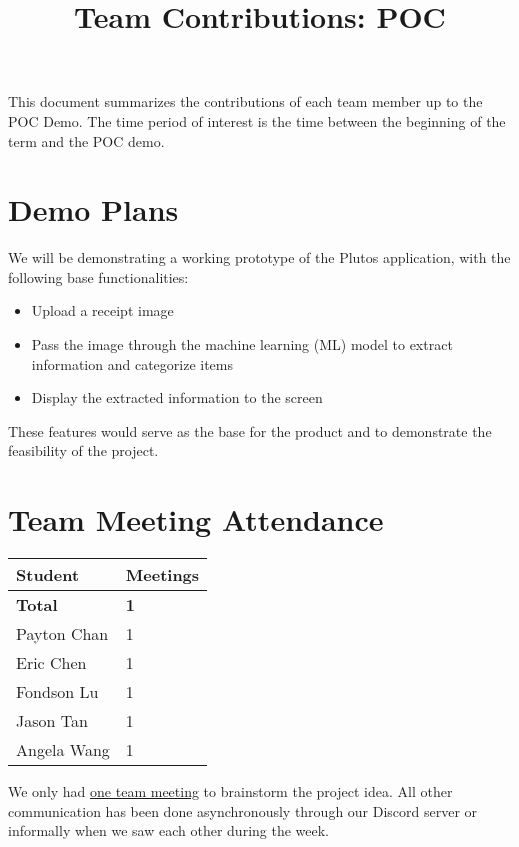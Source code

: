 \documentclass{article}
\title{Team Contributions: POC\\\progname}
\author{\authname}
\date{}
\begin{document}
\maketitle

This document summarizes the contributions of each team member up to the POC
Demo.  The time period of interest is the time between the beginning of the term
and the POC demo.

\section{Demo Plans}

We will be demonstrating a working prototype of the Plutos application, with the
following base functionalities:
\begin{itemize}
    \item Upload a receipt image
    \item Pass the image through the machine learning (ML) model to extract
    information and categorize items
    \item Display the extracted information to the screen
\end{itemize}

These features would serve as the base for the product and to demonstrate the
feasibility of the project.

\section{Team Meeting Attendance}

\begin{table}[H]
\centering
\begin{tabular}{ll}
\toprule
\textbf{Student} & \textbf{Meetings}\\
\midrule
\textbf{Total} & \textbf{1}\\
Payton Chan & 1\\
Eric Chen & 1\\
Fondson Lu & 1\\
Jason Tan & 1\\
Angela Wang & 1\\
\bottomrule
\end{tabular}
\end{table}

We only had \href{https://github.com/PlutosCapstone/Plutos/issues/9}{one team
meeting} to brainstorm the project idea. All other communication has been done
asynchronously through our Discord server or informally when we saw each other
during the week.
\end{document}
